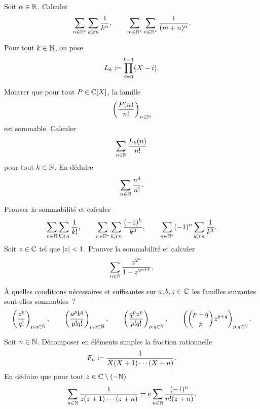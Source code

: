 \documentclass{magnolia}
\begin{document}


Soit $\alpha\in\mathbb{R}$. Calculer
\[\sum_{n\in{\mathbb{N}^*}} \sum_{k\geqslant n} \frac{1}{k^\alpha}, \qquad
  \sum_{m\in{\mathbb{N}^*}}\sum_{n\in{\mathbb{N}^*}} \frac{1}{(m+n)^{\alpha}}.\]


Pour tout $k\in\mathbb{N}$, on pose
\[L_k\coloneqq \prod_{i=0}^{k-1} (X-i).\]
\begin{questions}
\question Montrer que pour tout $P\in\polyC$, la famille
  \[\left(\frac{P(n)}{n!}\right)_{n\in\mathbb{N}}\]
  est sommable.
\question Calculer
  \[\sum_{n\in\mathbb{N}} \frac{L_k(n)}{n!}\]
  pour tout $k\in\mathbb{N}$.
\question En déduire
  \[\sum_{n\in\mathbb{N}} \frac{n^4}{n!}.\]
\end{questions}

\begin{questions}
\question Prouver la sommabilité et calculer
\[\sum_{n\in\mathbb{N}} \sum_{k\geqslant n} \frac{1}{k!}, \qquad
  \sum_{n\in{\mathbb{N}^*}} \sum_{k\geqslant n} \frac{(-1)^k}{k^3}, \qquad
  \sum_{n\in{\mathbb{N}^*}} (-1)^n \sum_{k\geqslant n} \frac{1}{k^3}.\]
\question Soit $z\in\mathbb{C}$ tel que $\left|z\right|<1$. Prouver la sommabilité et calculer
  \[\sum_{n\in\mathbb{N}} \frac{z^{2^n}}{1-z^{2^{n+1}}}.\]
\end{questions}

À quelles conditions nécessaires et suffisantes sur $a,b,z\in\mathbb{C}$ les familles suivantes
sont-elles sommables~?
\[\left(\frac{z^p}{q!}\right)_{p,q\in\mathbb{N}}, \qquad
  \left(\frac{a^p b^q}{p!q!}\right)_{p,q\in\mathbb{N}}, \qquad
  \left(\frac{q^p z^p}{p!q!}\right)_{p,q\in\mathbb{N}}, \qquad
  \left(\binom{p+q}{p}z^{p+q}\right)_{p,q\in\mathbb{N}}.\]

\begin{questions}
\question Soit $n\in\mathbb{N}$. Décomposer en éléments simples la fraction rationnelle
  \[F_n\coloneqq \frac{1}{X(X+1)\cdots(X+n)}.\]
\question En déduire que pour tout $z\in\mathbb{C}\setminus(-\mathbb{N})$
  \[\sum_{n\in\mathbb{N}} \frac{1}{z(z+1)\cdots(z+n)}={\rm e}\sum_{n\in\mathbb{N}} \frac{(-1)^n}{n!(z+n)}.\]
\end{questions}










%



\end{document}
